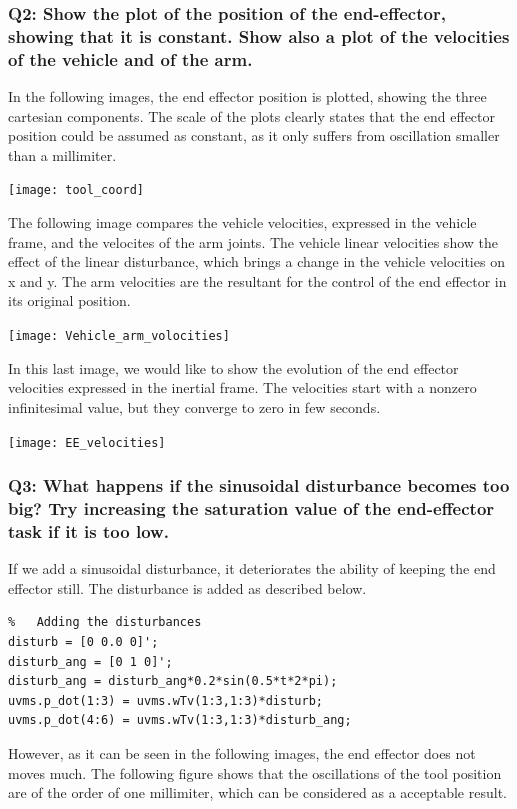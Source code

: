\documentclass{article}
\begin{document}
\subsubsection{Q2: Show the plot of the position of the end-effector, showing that it is constant. Show also a plot of the velocities of the vehicle and of the arm.}
In the following images, the end effector position is plotted, showing the three cartesian components. The scale of the plots clearly states that the end effector position could be assumed as constant, as it only suffers from oscillation smaller than a millimiter. 

\texttt{[image: tool\_coord]}
\centering

The following image compares the vehicle velocities, expressed in the vehicle frame, and the velocites of the arm joints. The vehicle linear velocities show the effect of the linear disturbance, which brings a change in the vehicle velocities on x and y. 
The arm velocities are the resultant for the control of the end effector in its original position. 

\texttt{[image: Vehicle\_arm\_volocities]}
\centering



In this last image, we would like to show the evolution of the end effector velocities expressed in the inertial frame. The velocities start with a nonzero infinitesimal value, but they converge to zero in few seconds.

\texttt{[image: EE\_velocities]}
\centering


\subsubsection{Q3: What happens if the sinusoidal disturbance becomes too big? Try increasing the saturation value of the end-effector task if it is too low.}
If we add a sinusoidal disturbance, it deteriorates the ability of keeping the end effector still. The disturbance is added as described below. 
\begin{lstlisting}
%	Adding the disturbances
disturb = [0 0.0 0]';
disturb_ang = [0 1 0]';
disturb_ang = disturb_ang*0.2*sin(0.5*t*2*pi);
uvms.p_dot(1:3) = uvms.wTv(1:3,1:3)*disturb;
uvms.p_dot(4:6) = uvms.wTv(1:3,1:3)*disturb_ang;
\end{lstlisting}
However, as it can be seen in the following images, the end effector does not moves much. 
The following figure shows that the oscillations of the tool position are of the order of one millimiter, which can be considered as a acceptable result. 
\end{document}
